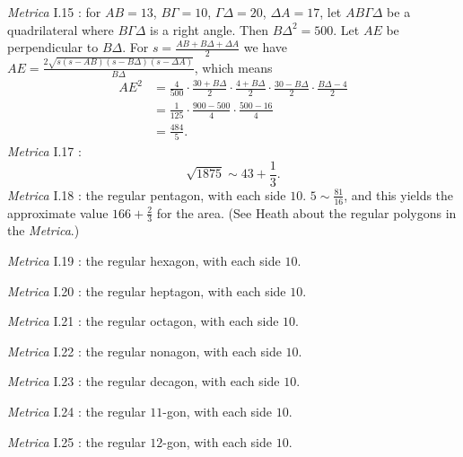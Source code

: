 \documentclass{amsart}
\theoremstyle{definition}
\begin{document}
{\em Metrica} I.15 \cite[pp.~41--43]{heronisIII}: for $AB=13$, $B\Gamma=10$,
$\Gamma \Delta=20$, $\Delta A=17$, let $AB\Gamma \Delta$ be a quadrilateral where
$B\Gamma \Delta$ is a right angle. Then $B\Delta^2 = 500$. Let $AE$ be perpendicular to $B\Delta$. For
$s=\frac{AB+B\Delta+\Delta A}{2}$ we have
$AE = \frac{2\sqrt{s(s-AB)(s-B\Delta)(s-\Delta A)}}{B\Delta}$, which means
\begin{align*}
AE^2 &= \frac{4}{500} \cdot \frac{30+B\Delta}{2} \cdot
\frac{4+B\Delta}{2} \cdot \frac{30-B\Delta}{2} \cdot \frac{B\Delta-4}{2}\\
&=\frac{1}{125} \cdot \frac{900-500}{4} \cdot \frac{500-16}{4}\\
&=\frac{484}{5}.
\end{align*}
{\em Metrica} I.17 \cite[p.~49]{heronisIII}: 
\[
\sqrt{1875} \sim 43+\frac{1}{3}.
\]
{\em Metrica} I.18 \cite[pp.~51--53]{heronisIII}: the regular pentagon, with each side $10$.
$5 \sim \frac{81}{16}$, and this yields the approximate value
$166+\frac{2}{3}$ for the area. (See Heath \cite[pp.~326--329]{HGMII} about the regular polygons in the {\em Metrica}.)

{\em Metrica} I.19 \cite[pp.~52--55]{heronisIII}: the regular hexagon, with each side $10$. 

{\em Metrica} I.20 \cite[pp.~54--57]{heronisIII}: the regular heptagon, with each side $10$.

{\em Metrica} I.21 \cite[pp.~57--59]{heronisIII}: the regular octagon, with each side $10$.

{\em Metrica} I.22 \cite[pp.~59--61]{heronisIII}: the regular nonagon, with each side $10$.

{\em Metrica} I.23 \cite[p.~61]{heronisIII}: the regular decagon, with each side $10$.

{\em Metrica} I.24 \cite[p.~63]{heronisIII}: the regular $11$-gon, with each side $10$.

{\em Metrica} I.25 \cite[pp.~63--65]{heronisIII}: the regular $12$-gon, with each side $10$.
\end{document}
